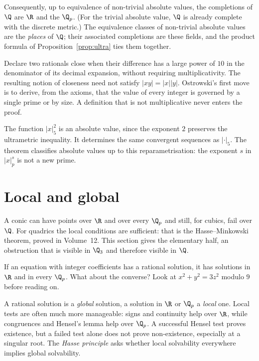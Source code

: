 Consequently, up to equivalence of non-trivial absolute values, the completions of $\Q$ are $\R$ and the $\Q_p$. (For the trivial absolute value, $\Q$ is already complete with the discrete metric.) The equivalence classes of non-trivial absolute values are the \emph{places} of $\Q$; their associated completions are these fields, and the product formula of Proposition~\ref{prop:ultra} ties them together.

\begin{examplex}
Declare two rationals close when their difference has a large power of $10$ in the denominator of its decimal expansion, without requiring multiplicativity. The resulting notion of closeness need not satisfy $|xy|=|x||y|$. Ostrowski's first move is to derive, from the axioms, that the value of every integer is governed by a single prime or by size. A definition that is not multiplicative never enters the proof.
\end{examplex}

\begin{examplex}
The function $|x|_5^2$ is an absolute value, since the exponent $2$ preserves the ultrametric inequality. It determines the same convergent sequences as $|\cdot|_5$. The theorem classifies absolute values up to this reparametrisation: the exponent $s$ in $|x|_p^s$ is not a new prime.
\end{examplex}

\section{Local and global}

A conic can have points over $\R$ and over every $\Q_p$ and still, for cubics, fail over $\Q$. For quadrics the local conditions are sufficient: that is the Hasse--Minkowski theorem, proved in Volume~12. This section gives the elementary half, an obstruction that is visible in $\Q_3$ and therefore visible in $\Q$.

\begin{think}
If an equation with integer coefficients has a rational solution, it has solutions in $\R$ and in every $\Q_p$. What about the converse? Look at $x^2+y^2=3z^2$ modulo $9$ before reading on.
\end{think}

A rational solution is a \emph{global} solution, a solution in $\R$ or $\Q_p$ a \emph{local} one. Local tests are often much more manageable: signs and continuity help over $\R$, while congruences and Hensel's lemma help over $\Q_p$. A successful Hensel test proves existence, but a failed test alone does not prove non-existence, especially at a singular root. The \emph{Hasse principle} asks whether local solvability everywhere implies global solvability.

